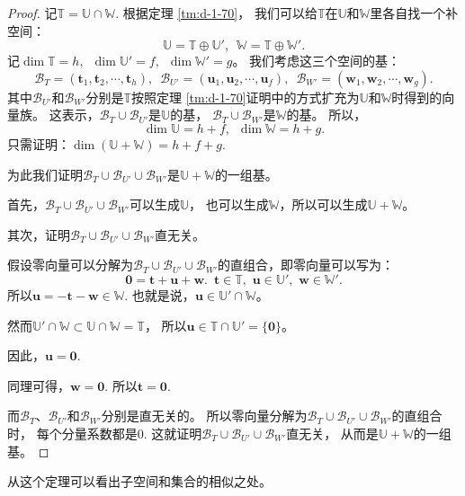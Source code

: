 \documentclass[12pt,UTF8,fontset=none]{ctexbook}
\begin{document}
\begin{appendix}
\begin{proof}
    记$\mathbb{T} = \mathbb{U} \cap \mathbb{W}$. 根据定理 \ref{tm:d-1-70}，
    我们可以给$\mathbb{T}$在$\mathbb{U}$和$\mathbb{W}$里各自找一个补空间：
    $$ \mathbb{U} = \mathbb{T} \oplus \mathbb{U}', \,\,\, \mathbb{W} = \mathbb{T} \oplus \mathbb{W}'.$$
    记$\dim \mathbb{T} = h, \,\,\, \dim \mathbb{U}' = f, \,\,\, \dim \mathbb{W}' = g$。
    我们考虑这三个空间的基：
    $$ \mathcal{B}_T = (\mathbf{t}_1, \mathbf{t}_2, \cdots, \mathbf{t}_h), \,\,\, \mathcal{B}_{U'} = (\mathbf{u}_1, \mathbf{u}_2, \cdots, \mathbf{u}_f), \,\,\, \mathcal{B}_{W'} = (\mathbf{w}_1, \mathbf{w}_2, \cdots, \mathbf{w}_g). $$  
    其中$\mathcal{B}_{U'}$和$\mathcal{B}_{W'}$分别是$\mathbb{T}$按照定理 
    \ref{tm:d-1-70}证明中的方式扩充为$\mathbb{U}$和$\mathbb{W}$时得到的向量族。
    这表示，$\mathcal{B}_T\cup\mathcal{B}_{U'}$是$\mathbb{U}$的基，
    $\mathcal{B}_T\cup\mathcal{B}_{W'}$是$\mathbb{W}$的基。
    所以，
    $$\dim \mathbb{U} = h + f,\,\,\,\dim \mathbb{W} = h + g.$$
    只需证明：$ \dim (\mathbb{U} + \mathbb{W}) = h + f + g.$

    为此我们证明$\mathcal{B}_T\cup\mathcal{B}_{U'}\cup\mathcal{B}_{W'}$是$\mathbb{U} + \mathbb{W}$的一组基。

    首先，$\mathcal{B}_T\cup\mathcal{B}_{U'}\cup\mathcal{B}_{W'}$可以生成$\mathbb{U}$，
    也可以生成$\mathbb{W}$，所以可以生成$\mathbb{U} + \mathbb{W}$。

    其次，证明$\mathcal{B}_T\cup\mathcal{B}_{U'}\cup\mathcal{B}_{W'}$直无关。

    假设零向量可以分解为$\mathcal{B}_T\cup\mathcal{B}_{U'}\cup\mathcal{B}_{W'}$的直组合，即零向量可以写为：
    $$ \mathbf{0} = \mathbf{t} + \mathbf{u} + \mathbf{w}. \,\,\,\mathbf{t}\in\mathbb{T},\,\,\mathbf{u}\in\mathbb{U}',\,\,\mathbf{w}\in\mathbb{W}'.$$
    所以$\mathbf{u} = -\mathbf{t} - \mathbf{w} \in \mathbb{W}$.
    也就是说，$\mathbf{u}\in \mathbb{U}'\cap\mathbb{W}$。

    然而$\mathbb{U}'\cap\mathbb{W} \subset \mathbb{U}\cap\mathbb{W} = \mathbb{T}$，
    所以$\mathbf{u}\in\mathbb{T}\cap\mathbb{U}' = \{\mathbf{0}\}$。

    因此，$\mathbf{u} = \mathbf{0}.$

    同理可得，$\mathbf{w} = \mathbf{0}.$ 所以$\mathbf{t} = \mathbf{0}.$

    而$\mathcal{B}_T$、$\mathcal{B}_{U'}$和$\mathcal{B}_{W'}$分别是直无关的。
    所以零向量分解为$\mathcal{B}_T\cup\mathcal{B}_{U'}\cup\mathcal{B}_{W'}$的直组合时，
    每个分量系数都是0. 
    这就证明$\mathcal{B}_T\cup\mathcal{B}_{U'}\cup\mathcal{B}_{W'}$直无关，
    从而是$\mathbb{U} + \mathbb{W}$的一组基。
\end{proof}

从这个定理可以看出子空间和集合的相似之处。


\end{appendix}
\end{document}
